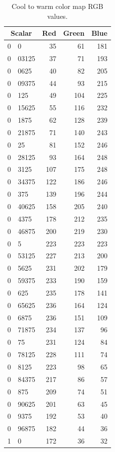 \documentclass{acmsiggraph}               %
\newcommand{\RGB}{RGB\xspace}
\begin{document}
\begin{table}
  \centering
  \caption{Cool to warm color map \RGB values.}
  \begin{tabular}{r@{.}l@{\qquad}rrr}
    \multicolumn{2}{c}{Scalar\qquad\qquad} & Red & Green & Blue \\
    \hline
    0&0 & 35 & 61 & 181 \\
    0&03125 & 37 & 71 & 193 \\
    0&0625 & 40 & 82 & 205 \\
    0&09375 & 44 & 93 & 215 \\
    0&125 & 49 & 104 & 225 \\
    0&15625 & 55 & 116 & 232 \\
    0&1875 & 62 & 128 & 239 \\
    0&21875 & 71 & 140 & 243 \\
    0&25 & 81 & 152 & 246 \\
    0&28125 & 93 & 164 & 248 \\
    0&3125 & 107 & 175 & 248 \\
    0&34375 & 122 & 186 & 246 \\
    0&375 & 139 & 196 & 244 \\
    0&40625 & 158 & 205 & 240 \\
    0&4375 & 178 & 212 & 235 \\
    0&46875 & 200 & 219 & 230 \\
    0&5 & 223 & 223 & 223 \\
    0&53125 & 227 & 213 & 200 \\
    0&5625 & 231 & 202 & 179 \\
    0&59375 & 233 & 190 & 159 \\
    0&625 & 235 & 178 & 141 \\
    0&65625 & 236 & 164 & 124 \\
    0&6875 & 236 & 151 & 109 \\
    0&71875 & 234 & 137 & 96 \\
    0&75 & 231 & 124 & 84 \\
    0&78125 & 228 & 111 & 74 \\
    0&8125 & 223 & 98 & 65 \\
    0&84375 & 217 & 86 & 57 \\
    0&875 & 209 & 74 & 51 \\
    0&90625 & 201 & 63 & 45 \\
    0&9375 & 192 & 53 & 40 \\
    0&96875 & 182 & 44 & 36 \\
    1&0 & 172 & 36 & 32
  \end{tabular}
  \label{table:Cool2WarmRGB}
\end{table}
\end{document}
